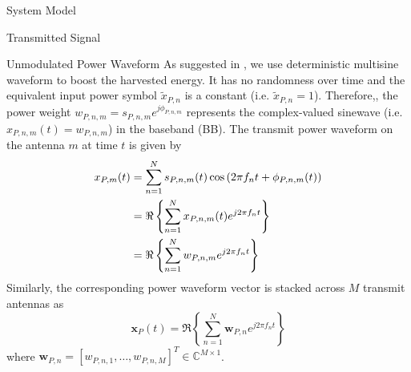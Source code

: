 \documentclass{IEEEtran}
\begin{document}
\begin{section} {System Model}
\begin{subsection}	{Transmitted Signal}
		\begin{subsubsection} {Unmodulated Power Waveform}
			As suggested in \cite{Clerckx2018b,Clerckx2016a}, we use deterministic multisine waveform to boost the harvested energy. It has no randomness over time and the equivalent input power symbol $\tilde{x}_{P,n}$ is a constant (i.e. $\tilde{x}_{P,n} = 1$). Therefore,, the power weight $w_{P,n,m} = s_{P,n,m} e^{j\phi_{P,n,m}}$ represents the complex-valued sinewave (i.e. $x_{P,n,m}(t) = w_{P,n,m}$) in the baseband (BB). The transmit power waveform on the antenna $m$ at time $t$ is given by
			\begin{equation}	\label{eq:x{P,m}(t)}
				\begin{split}
					x_{P,m}(t)
					&= \sum_{n=1}^{N} s_{P,n,m}(t) \cos \left( 2 \pi f_n t + \phi_{P,n,m}(t) \right)	\\
					&= \Re \left\{ \sum_{n=1}^{N} x_{P,n,m}(t) e^{j2 \pi f_n t} \right\}	\\
					&= \Re \left\{ \sum_{n=1}^{N} w_{P,n,m} e^{j2 \pi f_n t} \right\}
				\end{split}
			\end{equation}
			Similarly, the corresponding power waveform vector is stacked across $M$ transmit antennas as
			\begin{equation}	\label{eq:x_P(t)}
				\boldsymbol{x}_P(t) = \Re \left\{ \sum_{n=1}^{N} \boldsymbol{w}_{P,n} e^{j2{\pi}{f_n}t} \right\}
			\end{equation}
			where $\boldsymbol{w}_{P,n}=[w_{P,n,1},\dots,w_{P,n,M}]^T \in \mathbb{C}^{M \times 1}$.
		\end{subsubsection}


\end{subsection}
\end{section}
\end{document}
